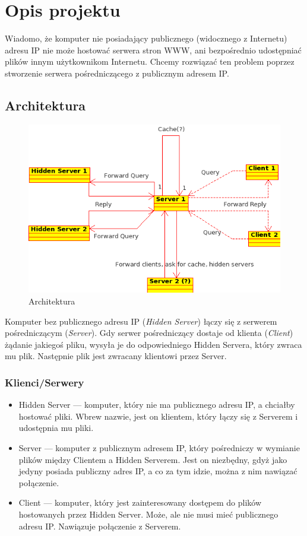 \documentclass[a4paper,notitlepage]{article}
\begin{document}
\pagestyle{fancy}
\section{Opis projektu}
Wiadomo, że komputer nie posiadający publicznego (widocznego z Internetu)
adresu IP nie może hostować serwera stron WWW, ani bezpośrednio udostępniać plików
innym użytkownikom Internetu. Chcemy rozwiązać ten problem poprzez stworzenie
serwera pośredniczącego z publicznym adresem IP.
\subsection{Architektura}
\begin{figure}[h]
\includegraphics[width=\linewidth]{class_diagram}
\caption{Architektura}
\end{figure}
Komputer bez publicznego adresu IP (\emph{Hidden Server}) łączy się z serwerem
pośredniczącym (\emph{Server}). Gdy serwer pośredniczący dostaje od klienta (\emph{Client})
żądanie jakiegoś pliku, wysyła je do odpowiedniego Hidden Servera, który zwraca mu plik.
Następnie plik jest zwracany klientowi przez Server.
\subsubsection{Klienci/Serwery}
\begin{itemize}
\item Hidden Server --- komputer, który nie ma publicznego adresu IP, a chciałby hostować pliki.
Wbrew nazwie, jest on klientem, który łączy się z Serverem i udostępnia mu pliki.
\item Server --- komputer z publicznym adresem IP, który pośredniczy w wymianie plików między
Clientem a Hidden Serverem. Jest on niezbędny, gdyż jako jedyny posiada publiczny adres IP,
a co za tym idzie, można z nim nawiązać połączenie.
\item Client --- komputer, który jest zainteresowany dostępem do plików hostowanych przez
Hidden Server. Może, ale nie musi mieć publicznego adresu IP. Nawiązuje połączenie z Serverem.
\end{itemize}
\end{document}
